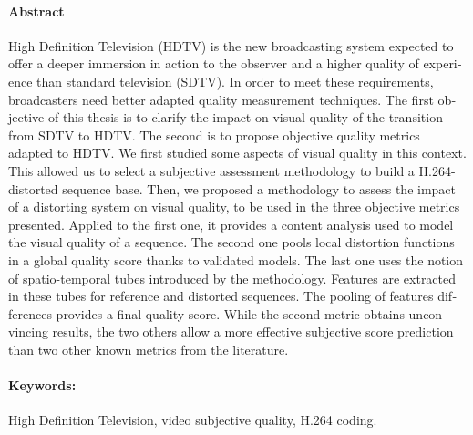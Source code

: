 \begin{otherlanguage}{english}
\paragraph*{Abstract}
High Definition Television (HDTV) is the new broadcasting system expected to offer a deeper immersion in action to the observer and a higher quality of experience than standard television (SDTV). In order to meet these requirements, broadcasters need better adapted quality measurement techniques. The first objective of this thesis is to clarify the impact on visual quality of the transition from SDTV to HDTV. The second is to propose objective quality metrics adapted to HDTV. We first studied some aspects of visual quality in this context. This allowed us to select a subjective assessment methodology to build a H.264-distorted sequence base. Then, we proposed a methodology to assess the impact of a distorting system on visual quality, to be used in the three objective metrics presented. Applied to the first one, it provides a content analysis used to model the visual quality of a sequence. The second one pools local distortion functions in a global quality score thanks to validated models. The last one uses the notion of spatio-temporal tubes introduced by the methodology. Features are extracted in these tubes for reference and distorted sequences. The pooling of features differences provides a final quality score. While the second metric obtains unconvincing results, the two others allow a more effective subjective score prediction than two other known metrics from the literature.

\paragraph*{Keywords:} High Definition Television, video subjective quality, H.264 coding.

\end{otherlanguage}

